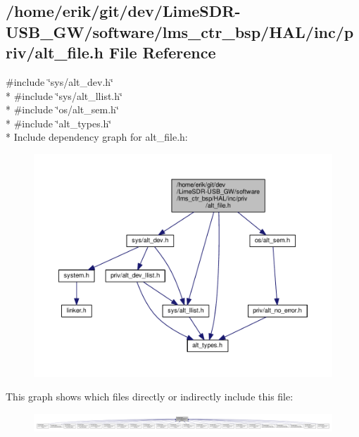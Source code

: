 \subsection{/home/erik/git/dev/\+Lime\+S\+D\+R-\/\+U\+S\+B\+\_\+\+G\+W/software/lms\+\_\+ctr\+\_\+bsp/\+H\+A\+L/inc/priv/alt\+\_\+file.h File Reference}
\label{alt__file_8h}
{\ttfamily \#include \char`\"{}sys/alt\+\_\+dev.\+h\char`\"{}}\\*
{\ttfamily \#include \char`\"{}sys/alt\+\_\+llist.\+h\char`\"{}}\\*
{\ttfamily \#include \char`\"{}os/alt\+\_\+sem.\+h\char`\"{}}\\*
{\ttfamily \#include \char`\"{}alt\+\_\+types.\+h\char`\"{}}\\*
Include dependency graph for alt\+\_\+file.\+h\+:
\nopagebreak
\begin{figure}[H]
\begin{center}
\leavevmode
\includegraphics[width=350pt]{d8/df3/alt__file_8h__incl}
\end{center}
\end{figure}
This graph shows which files directly or indirectly include this file\+:
\nopagebreak
\begin{figure}[H]
\begin{center}
\leavevmode
\includegraphics[width=350pt]{de/d9d/alt__file_8h__dep__incl}
\end{center}
\end{figure}
